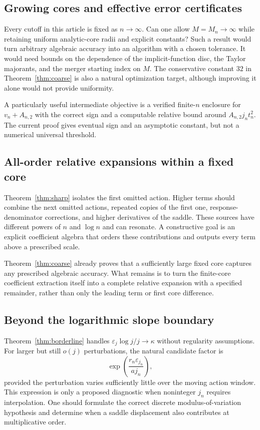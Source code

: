 \documentclass[11pt,a4paper]{article}
\numberwithin{equation}{section}
\theoremstyle{definition}
\theoremstyle{remark}
\begin{document}
\subsection{Growing cores and effective error certificates}

Every cutoff in this article is fixed as $n\to\infty$. Can one allow
$M=M_n\to\infty$ while retaining uniform analytic-core radii and explicit
constants? Such a result would turn arbitrary algebraic accuracy into an
algorithm with a chosen tolerance. It would need bounds on the dependence
of the implicit-function disc, the Taylor majorants, and the merger starting
index on $M$. The conservative constant $32$ in
Theorem~\ref{thm:coarse} is also a natural optimization target, although
improving it alone would not provide uniformity.

A particularly useful intermediate objective is a verified finite-$n$
enclosure for $v_n+A_{n,2}$ with the correct sign and a computable relative
bound around $A_{n,2}j_nt_n^2$. The current proof gives eventual sign and
an asymptotic constant, but not a numerical universal threshold.

\subsection{All-order relative expansions within a fixed core}

Theorem~\ref{thm:sharp} isolates the first omitted action. Higher terms
should combine the next omitted actions, repeated copies of the first one,
response-denominator corrections, and higher derivatives of the saddle.
These sources have different powers of $n$ and $\log n$ and can resonate.
A constructive goal is an explicit coefficient algebra that orders these
contributions and outputs every term above a prescribed scale.

Theorem~\ref{thm:coarse} already proves that a sufficiently large fixed core
captures any prescribed algebraic accuracy. What remains is to turn the
finite-core coefficient extraction itself into a complete relative
expansion with a specified remainder, rather than only the leading
term or first core difference.

\subsection{Beyond the logarithmic slope boundary}

Theorem~\ref{thm:borderline} handles
$\varepsilon_j\log j/j\to\kappa$ without regularity assumptions.
For larger but still $o(j)$ perturbations, the natural candidate factor is
\[
 \exp\!\left(\frac{r_n\varepsilon_{j_n}}{a j_n}\right),
\]
provided the perturbation varies sufficiently little over the moving action
window. This expression is only a proposed diagnostic when noninteger
$j_n$ requires interpolation. One should formulate the correct discrete
modulus-of-variation hypothesis and determine when a saddle displacement
also contributes at multiplicative order.
\end{document}
